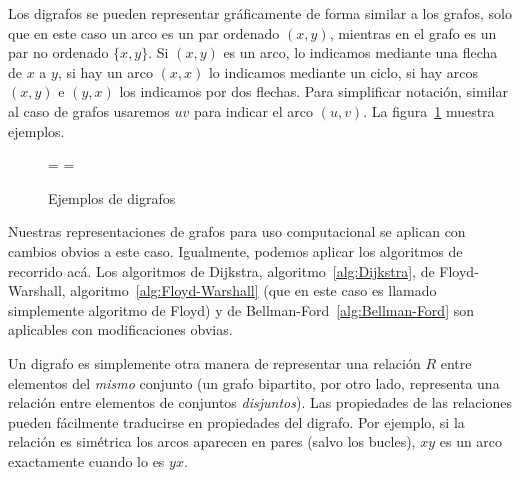   Los digrafos se pueden representar gráficamente
  de forma similar a los grafos,
  solo que en este caso un arco es un par ordenado \((x, y)\),
  mientras en el grafo es un par no ordenado \(\{x, y\}\).
  Si \((x, y)\) es un arco,
  lo indicamos mediante una flecha de \(x\) a \(y\),
  si hay un arco \((x, x)\) lo indicamos mediante un ciclo,
  si hay arcos \((x, y)\) e \((y, x)\)
  los indicamos por dos flechas.
  Para simplificar notación,
  similar al caso de grafos
  usaremos \(u v\) para indicar el arco \((u, v)\).
  La figura~\ref{fig:digrafos} muestra ejemplos.
  \begin{figure}[htbp]
    =\hbox{}
    =\hbox{}
    \centering
    \subfloat{\raisebox{0.5\ht2-0.5\ht1}{\copy1}}%
    \hspace{3em}%
    \caption{Ejemplos de digrafos}
    \label{fig:digrafos}
  \end{figure}
  Nuestras representaciones de grafos para uso computacional
  se aplican con cambios obvios a este caso.%
  Igualmente,
  podemos aplicar los algoritmos de recorrido acá.
  Los algoritmos de Dijkstra,
  algoritmo~\ref{alg:Dijkstra},%
  de Floyd-Warshall,
  algoritmo~\ref{alg:Floyd-Warshall}%
  (que en este caso es llamado simplemente algoritmo de Floyd)%
  y de Bellman-Ford~\ref{alg:Bellman-Ford}%
  son aplicables con modificaciones obvias.

  Un digrafo
  es simplemente otra manera de representar una relación \(R\)%
  entre elementos del \emph{mismo} conjunto
  (un grafo bipartito,
  por otro lado,
  representa una relación
  entre elementos de conjuntos \emph{disjuntos}).
  Las propiedades de las relaciones pueden fácilmente traducirse
  en propiedades del digrafo.
  Por ejemplo,
  si la relación es simétrica los arcos aparecen en pares
  (salvo los bucles),
  \(x y\) es un arco exactamente cuando lo es \(y x\).

